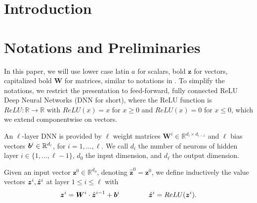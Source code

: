 \documentclass{llncs}
\begin{document}
\begin{abstract}
		
	\end{abstract}
	

\section{Introduction}


%


\section{Notations and Preliminaries}

In this paper, we will use lower case latin $a$ for scalars, bold $\boldsymbol{z}$ for vectors, 
capitalized bold $\boldsymbol{W}$ for matrices, similar to notations in \textcolor{blue}{\cite{crown}}.
To simplify the notations, we restrict the presentation to feed-forward, 
fully connected ReLU Deep Neural Networks (DNN for short), where the ReLU function is $ReLU : \mathbb{R} \rightarrow \mathbb{R}$ with
$ReLU(x)=x$ for $x \geq 0$ and $ReLU(x)=0$ for $x \leq 0$, which we extend componentwise on vectors.




An $\ell$-layer DNN is provided by $\ell$ weight matrices 
$\boldsymbol{W}^i \in \mathbb{R}^{d_i\times d_{i-1}}$
and $\ell$ bias vectors ${\bm{b}}^i \in \mathbb{R}^{d_i}$, for $i=1, \ldots, \ell$.
We call $d_i$ the number of neurons of hidden layer $i \in \{1, \ldots, \ell-1\}$,
$d_0$ the input dimension, and $d_\ell$ the output dimension.

Given an input vector $\boldsymbol{z}^0 \in \mathbb{R}^{d_0}$, 
denoting $\hat{\boldsymbol{z}}^{0}={\boldsymbol{z}}^0$, we define inductively the value vectors $\boldsymbol{z}^i,\hat{{\bm{z}}}^i$ at layer $1 \leq i \leq \ell$ with
\begin{align*}
	\boldsymbol{z}^{i} = \boldsymbol{W}^i\cdot \hat{\boldsymbol{z}}^{i-1}+ {\bm{b}}^i \qquad \, \qquad
	\hat{\boldsymbol{z}}^{i} = ReLU({\boldsymbol{z}}^i).
\end{align*} 
\end{document}
